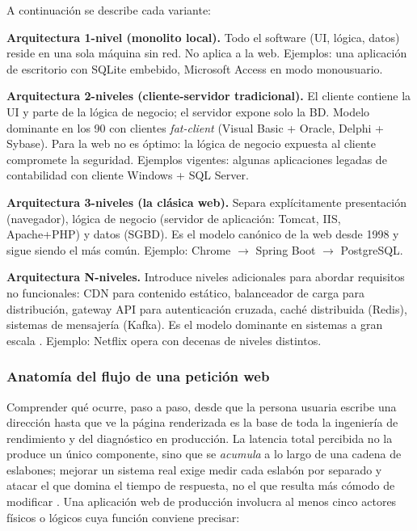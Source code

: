 A continuación se describe cada variante:

\textbf{Arquitectura 1-nivel (monolito local).} Todo el software (UI,
lógica, datos) reside en una sola máquina sin red. No aplica a la
web. Ejemplos: una aplicación de escritorio con SQLite embebido,
Microsoft Access en modo monousuario.

\textbf{Arquitectura 2-niveles (cliente-servidor tradicional).} El
cliente contiene la UI y parte de la lógica de negocio; el servidor
expone solo la BD. Modelo dominante en los 90 con clientes
\emph{fat-client} (Visual Basic + Oracle, Delphi + Sybase). Para la
web no es óptimo: la lógica de negocio expuesta al cliente compromete
la seguridad. Ejemplos vigentes: algunas aplicaciones legadas de
contabilidad con cliente Windows + SQL Server.

\textbf{Arquitectura 3-niveles (la clásica web).} Separa
explícitamente presentación (navegador), lógica de negocio (servidor
de aplicación: Tomcat, IIS, Apache+PHP) y datos (SGBD). Es el modelo
canónico de la web desde 1998 y sigue siendo el más común. Ejemplo:
Chrome $\to$ Spring Boot $\to$ PostgreSQL.

\textbf{Arquitectura N-niveles.} Introduce niveles adicionales para
abordar requisitos no funcionales: CDN para contenido estático,
balanceador de carga para distribución, gateway API para
autenticación cruzada, caché distribuida (Redis), sistemas de
mensajería (Kafka). Es el modelo dominante en sistemas a gran escala
\cite{bass2021software,kleppmann2017designing}. Ejemplo: Netflix
opera con decenas de niveles distintos.

\subsubsection{Anatomía del flujo de una petición web}
	Comprender qué ocurre, paso a paso, desde que la persona usuaria escribe una dirección hasta que ve la página renderizada es la base de toda la ingeniería de rendimiento y del diagnóstico en producción. La latencia total percibida no la produce un único componente, sino que se \emph{acumula} a lo largo de una cadena de eslabones; mejorar un sistema real exige medir cada eslabón por separado y atacar el que domina el tiempo de respuesta, no el que resulta más cómodo de modificar \cite{grigorik2013hpbn,kleppmann2017designing}. Una aplicación web de producción involucra al menos cinco actores físicos o lógicos cuya función conviene precisar:

